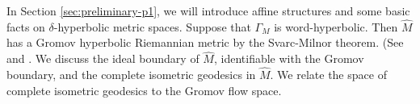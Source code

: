In Section \ref{sec:preliminary-p1}, we will introduce  affine structures and 
some basic facts on $\delta$-hyperbolic metric spaces. 
Suppose that $\Gamma_M$ is word-hyperbolic.
Then $\hat M$ has a Gromov hyperbolic Riemannian metric
by the Svarc-Milnor theorem. 
(See \cite{Milnor} and \cite{Svarc}. 
We discuss the ideal boundary of $\hat M$, identifiable with the Gromov boundary, and the complete isometric geodesics in $\hat M$. 
We relate the space of complete isometric geodesics to
the Gromov flow space. 





